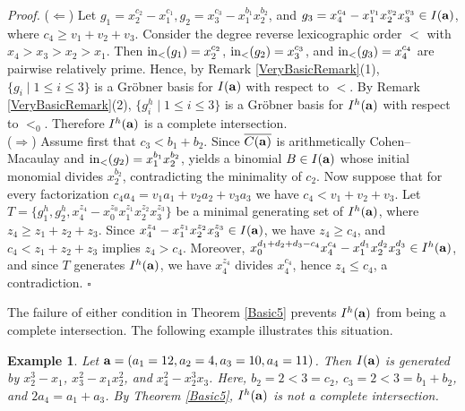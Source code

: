\documentclass[10pt]{amsart}
\newtheorem{ex1}[thm1]{Example}
\begin{document}
{\em \noindent Proof.} ($\Leftarrow$) Let $g_{1}=x_{2}^{c_2}-x_{1}^{c_1}, g_{2}=x_{3}^{c_3}-x_{1}^{b_1}x_{2}^{b_2}$, and $g_{3}=x_{4}^{c_4}-x_{1}^{v_1}x_{2}^{v_2}x_{3}^{v_3} \in I({\bf a})$, where $c_{4} \geq v_1+v_{2}+v_{3}$. Consider the degree reverse lexicographic order $<$ with $x_{4}>x_{3}>x_{2}>x_{1}$. Then ${\rm in}_{<}(g_1)=x_{2}^{c_2}$, ${\rm in}_{<}(g_2)=x_{3}^{c_3}$, and ${\rm in}_{<}(g_{3})=x_{4}^{c_4}$ are pairwise relatively prime. Hence, by Remark \ref{VeryBasicRemark}(1), $\{g_{i} \mid 1 \leq i \leq 3\}$ is a Gr\"obner basis for $I({\bf a})$ with respect to $<$. By Remark \ref{VeryBasicRemark}(2), $\{g_{i}^{h} \mid 1 \leq i \leq 3\}$ is a Gr\"obner basis for $I^{h}({\bf a})$ with respect to $<_{0}$. Therefore $I^{h}({\bf a})$ is a complete intersection.\\
($\Rightarrow$) Assume first that $c_3<b_1+b_2$. Since $\overline{C({\bf a})}$ is arithmetically Cohen--Macaulay and ${\rm in}_{<}(g_2)=x_1^{b_1}x_2^{b_2}$, \cite[Theorem~2.2]{HerSta} yields a binomial $B\in I({\bf a})$
whose initial monomial divides $x_2^{b_2}$, contradicting
the minimality of $c_2$. Now suppose that for every factorization $c_{4}a_{4}=v_{1}a_{1}+v_{2}a_{2}+v_{3}a_{3}$ we have $c_{4}<v_1+v_{2}+v_{3}$. Let $T=\{g_{1}^{h}, g_{2}^{h}, x_{4}^{z_4}-x_{0}^{z_{0}}x_{1}^{z_1}x_{2}^{z_2}x_{3}^{z_3}\}$ be a minimal generating set of $I^{h}({\bf a})$, where $z_{4} \geq z_{1}+z_{2}+z_{3}$. Since $x_{4}^{z_4}-x_{1}^{z_1}x_{2}^{z_2}x_{3}^{z_3} \in I({\bf a})$, we have $z_{4} \geq c_4$, and $c_4<z_1+z_2+z_3$ implies $z_4>c_4$. Moreover, $x_{0}^{d_1+d_2+d_3-c_4}x_{4}^{c_4}-x_{1}^{d_1}x_2^{d_2}x_{3}^{d_3} \in I^{h}({\bf a})$, and since $T$ generates $I^{h}({\bf a})$, we have $x_{4}^{z_4}$ divides $x_{4}^{c_4}$, hence $z_{4} \leq c_4$, a contradiction. \hfill $\square$ \par\vspace{0.5\baselineskip}

The failure of either condition in Theorem \ref{Basic5} prevents $I^{h}({\bf a})$ from being a complete intersection. The following example illustrates this situation.

\begin{ex1} {\rm Let ${\bf a}=(a_1=12, a_2=4, a_3=10, a_4=11)$. Then $I({\bf a})$ is generated by $x_{2}^{3}-x_1$, $x_{3}^{2}-x_{1}x_{2}^{2}$, and $x_{4}^{2}-x_{2}^{3}x_{3}$. Here, $b_{2}=2<3=c_{2}$, $c_{3}=2<3=b_{1}+b_{2}$, and $2a_4=a_1+a_3$. By Theorem \ref{Basic5}, $I^{h}({\bf a})$ is not a complete intersection.}
\end{ex1}
\end{document}
